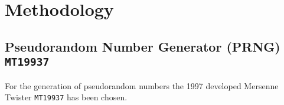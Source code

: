 \section{Methodology}

\subsection{Pseudorandom Number Generator (PRNG) \texttt{MT19937}}\label{ssec:methodology_rng_mt19937}

For the generation of pseudorandom numbers the 1997 developed Mersenne\,Twister \texttt{MT19937} has been chosen.\cite{educativeMersenneTwister}\cite{Makoto_Takuji}